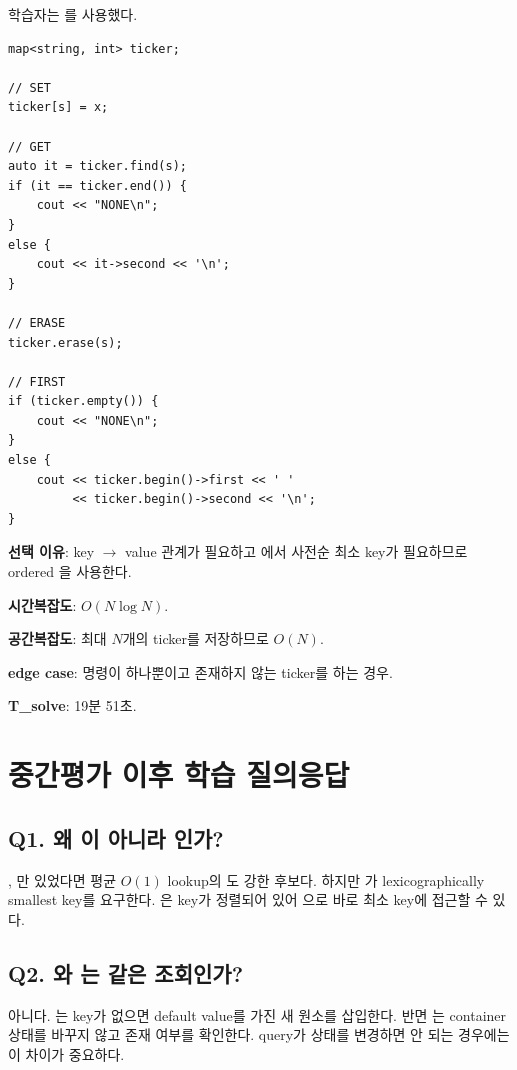 \begin{answerbox}[학습자 제출 구조]
학습자는 를 사용했다.
\begin{lstlisting}
map<string, int> ticker;

// SET
ticker[s] = x;

// GET
auto it = ticker.find(s);
if (it == ticker.end()) {
    cout << "NONE\n";
}
else {
    cout << it->second << '\n';
}

// ERASE
ticker.erase(s);

// FIRST
if (ticker.empty()) {
    cout << "NONE\n";
}
else {
    cout << ticker.begin()->first << ' '
         << ticker.begin()->second << '\n';
}
\end{lstlisting}

\textbf{선택 이유}: key $\to$ value 관계가 필요하고 에서 사전순 최소 key가 필요하므로 ordered 을 사용한다.

\textbf{시간복잡도}: $O(N\log N)$.

\textbf{공간복잡도}: 최대 $N$개의 ticker를 저장하므로 $O(N)$.

\textbf{edge case}: 명령이 하나뿐이고 존재하지 않는 ticker를 하는 경우.

\textbf{T\_solve}: 19분 51초.
\end{answerbox}

\section{중간평가 이후 학습 질의응답}

\subsection{Q1. 왜 이 아니라 인가?}
, 만 있었다면 평균 $O(1)$ lookup의 도 강한 후보다. 하지만 가 lexicographically smallest key를 요구한다. 은 key가 정렬되어 있어 으로 바로 최소 key에 접근할 수 있다.

\subsection{Q2. 와 는 같은 조회인가?}
아니다. 는 key가 없으면 default value를 가진 새 원소를 삽입한다. 반면 는 container 상태를 바꾸지 않고 존재 여부를 확인한다. query가 상태를 변경하면 안 되는 경우에는 이 차이가 중요하다.

